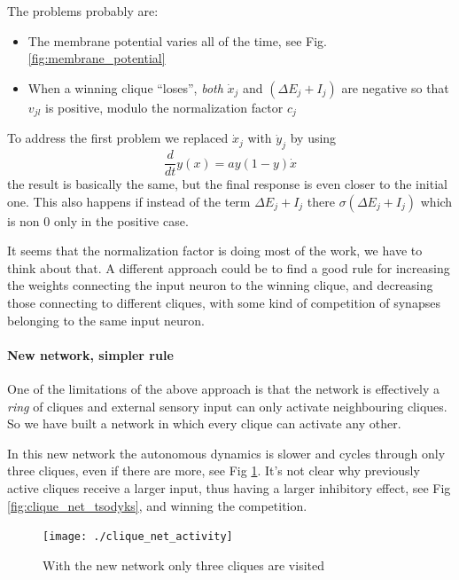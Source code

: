 \documentclass[10pt,a4paper]{article}
\begin{document}
		The problems probably are:
			\begin{itemize}
				\item The membrane potential varies all of the time, see Fig. \ref{fig:membrane_potential}
				\item When a winning clique ``loses'', \emph{both} $\dot{x}_j$ and  $\left(\Delta E_j + I_j\right)$ are negative so that $v_{jl}$ is positive, modulo the normalization factor $c_j$
			\end{itemize}
		To address the first problem we replaced $\dot{x}_j$ with $\dot{y}_j$ by using
		\begin{equation}
		\frac{d}{dt}y(x) = a y (1-y) \dot{x}
		\end{equation}
		the result is basically the same, but the final response is even closer to the initial one.
		This also happens if instead of the term $\Delta E_j + I_j$ there $\sigma\left(\Delta E_j + I_j\right)$ which is non 0 only in the positive case.
		
		It seems that the normalization factor is doing most of the work, we have to think about that. A different approach could be to find a good rule for increasing the weights connecting the input neuron to the winning clique, and decreasing those connecting to different cliques, with some kind of competition of synapses belonging to the same input neuron.
		
		\newpage
		\paragraph{New network, simpler rule} One of the limitations of the above approach is that the network is effectively a \emph{ring} of cliques and external sensory input can only activate neighbouring cliques. So we have built a network in which every clique can activate any other.
		
		In this new network the autonomous dynamics is slower and cycles through only three cliques, even if there are more, see Fig \ref{fig:clique_net_activity}. It's not clear why previously active cliques receive a larger input, thus having a larger inhibitory effect, see Fig \ref{fig:clique_net_tsodyks}, and winning the competition. 
		
		\begin{figure}
			\centering
			\texttt{[image: ./clique\_net\_activity]}
			\label{fig:clique_net_activity}
			\caption{With the new network only three cliques are visited}
		\end{figure}
		
\end{document}
